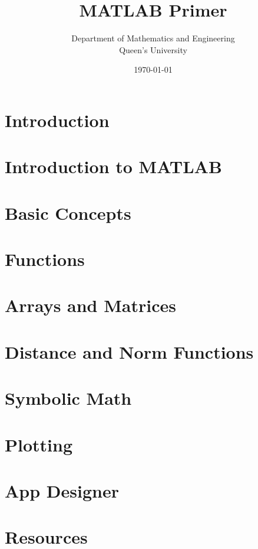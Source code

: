 \documentclass{article}
\title{MATLAB Primer}
\author{Department of Mathematics and Engineering\\
        Queen's University}
\date{\today}
\begin{document}
\maketitle
\newpage
\tableofcontents
\newpage

\section{Introduction} \label{Introduction}

\newpage

\section{Introduction to MATLAB} \label{Introduction to MATLAB}

\newpage

\section{Basic Concepts} \label{Basic Concepts}

\newpage

\section{Functions} \label{Functions}

\newpage

\section{Arrays and Matrices} \label{Arrays and Matrices}

\newpage


\section{Distance and Norm Functions} \label{Distance and Norm Functions}

\newpage

\section{Symbolic Math} \label{Symbolic}

\newpage
 
\section{Plotting} \label{Plotting}

\newpage

\section{App Designer} \label{App Designer}

\newpage

\section{Resources} \label{Resources}

\end{document}
